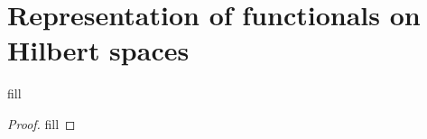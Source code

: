 \section{Representation of functionals on Hilbert spaces}

\begin{exercise}{1}
fill
\end{exercise}
\begin{proof}
fill
\end{proof}